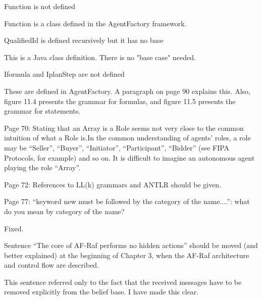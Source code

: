 \documentclass{article}
\newcommand{\todo}[1]{[\textcolor{red}{TODO}: #1]}
\newenvironment{them}{\noindent\begingroup\color{blue}}{\endgroup\par}
\begin{document}
\begin{them}

Function is not defined 

\end{them}
Function is a class defined in the AgentFactory framework.

\begin{them}

QualifiedId is defined recursively but it has no base

\end{them}
This is a Java class definition. There is no "base case" needed.

\begin{them}

Iformula and IplanStep are not defined

\end{them}
These are defined in AgentFactory. A paragraph on page 90  explains this. Also,
figure 11.4 presents the grammar for formulas, and figure 11.5 presents the
grammar for statements.

\begin{them}

Page 70:
Stating that an Array is a Role seems not very close to the common intuition of
what a Role is.In the common understanding of agents' roles, a role may be
“Seller”, “Buyer”, “Initiator”, “Participant”, “Bidder” (see FIPA Protocols,
for example) and so on. It is difficult to imagine an autonomous agent playing
the role “Array”.

\end{them}
\todo{}

\begin{them}

Page 72:
References to LL(k) grammars and ANTLR should be given.
\end{them}
\todo{}

\begin{them}

Page 77:
“keyword new must be followed by the category of the name....”: what do you
mean by category of the name?

\end{them}
Fixed.

\begin{them}

Sentence “The core of AF-Raf performs no hidden actions” should be moved (and
better explained) at the beginning of Chapter 3, when the AF-Raf architecture
and control flow are described.

\end{them}
This sentence referred only to the fact that the received messages have to be
removed explicitly from the belief base. I have made this clear.
\end{document}
